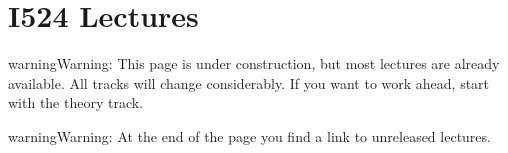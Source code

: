 \section{I524 Lectures}
\label{\detokenize{i524/lectures:surveys}}\label{\detokenize{i524/lectures::doc}}\label{\detokenize{i524/lectures:i524-lectures}}
\begin{sphinxadmonition}{warning}{Warning:}
This page is under construction, but most lectures are
already available. All tracks will change
considerably. If you want to work ahead, start with the
theory track.
\end{sphinxadmonition}

\begin{sphinxadmonition}{warning}{Warning:}
At the end of the page you find a link to unreleased
lectures.
\end{sphinxadmonition}

